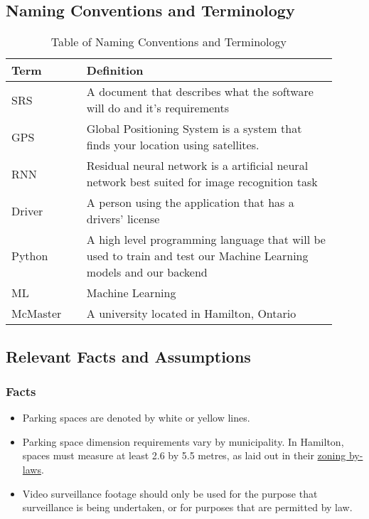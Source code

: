 \documentclass[12pt,letterpaper]{article}
\newcommand{\newterm}[1]{\label{Term:#1} \MakeUppercase #1}
\begin{document}
\newpage
\subsection{Naming Conventions and Terminology}
\label{sub:Naming Conventions and Terminology}
\begin{table}[h!]
    \centering
    \caption{Table of Naming Conventions and Terminology}
    \label{tab:Definitions}
    \begin{tabular}{p{0.21\linewidth}  p{0.70\linewidth}}
    \toprule
    \textbf{Term} & \textbf{Definition}\\
    \midrule
    \newterm{SRS} & A document that describes what the software will do and it's requirements\\
    \hline
    \newterm{GPS} & Global Positioning System is a system that finds your location using satellites.\\
    \hline
    \newterm{RNN} & Residual neural network is a artificial neural network best suited for image recognition task \\
    \hline
    \newterm{Driver} & A person using the application that has a drivers' license\\
    \hline
    \newterm{Python} & A high level programming language that will be used to train and test our Machine Learning models and our backend\\
    \hline
    \newterm{ML} & Machine Learning\\
    \hline
    \newterm{McMaster} & A university located in Hamilton, Ontario\\
    \bottomrule
    \end{tabular}
\end{table}

\subsection{Relevant Facts and Assumptions}
\subsubsection{Facts}
\begin{itemize}
    \item Parking spaces are denoted by white or yellow lines.
    \item Parking space dimension requirements vary by municipality. In Hamilton, spaces must measure at least 2.6 by 5.5 metres, as laid out in their \href{http://www2.hamilton.ca/NR/rdonlyres/D4866111-3F89-42C3-9594-1E7E7F3028AD/0/ZBL05200Section5Parking.pdf}{zoning by-laws}.
    \item Video surveillance footage should only be used for the purpose that surveillance is being undertaken, or for purposes that are permitted by law.
\end{itemize}
\end{document}
